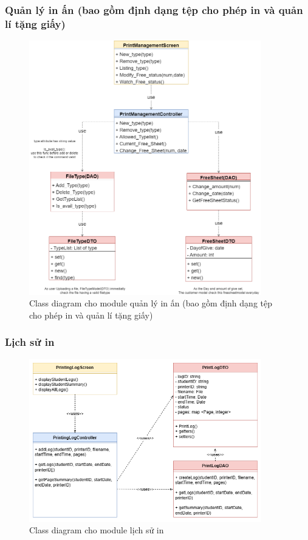 \subsubsection{Quản lý in ấn (bao gồm định dạng tệp cho phép in và quản lí tặng giấy)}
\begin{figure}[H]
    \begin{center}
        \includegraphics[width=0.9\textwidth]{Images/System Modelling/PS_Class.png}
        \caption{Class diagram cho module quản lý in ấn (bao gồm định dạng tệp cho phép in và quản lí tặng giấy)}
        \label{fig:arch}
    \end{center}
\end{figure}
\subsubsection{Lịch sử in}
\begin{figure}[H]
    \begin{center}
        \includegraphics[width=0.9\textwidth]{Images/System Modelling/Logging_Class.png}
        \caption{Class diagram cho module lịch sử in}
        \label{fig:arch}
    \end{center}
\end{figure}